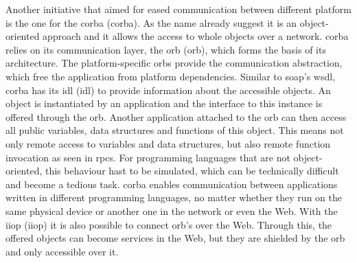 Another initiative that aimed for eased communication between different platform is the one for the \textrm{\acrlong{corba} (\acrshort{corba})}\cite{dec1991common}.
As the name already suggest it is an object-oriented approach and it allows the access to whole objects over a network.
\textrm{\acrshort{corba}} relies on its communication layer, the \textrm{\acrlong{orb} (\acrshort{orb})}, which forms the basis of its architecture.
The platform-specific \textrm{\acrshort{orb}}s provide the communication abstraction, which free the application from platform dependencies.
Similar to \textrm{\acrshort{soap}}'s \textrm{\acrshort{wsdl}}, \textrm{\acrshort{corba}} has its \textrm{\acrlong{idl} (\acrshort{idl})} to provide information about the accessible objects.
An object is instantiated by an application and the interface to this instance is offered through the \textrm{\acrshort{orb}}.
Another application attached to the \textrm{\acrshort{orb}} can then access all public variables, data structures and functions of this object.
This means not only remote access to variables and data structures, but also remote function invocation as seen in \textrm{\acrshort{rpc}}s.
For programming languages that are not object-oriented, this behaviour hast to be simulated, which can be technically difficult and become a tedious task.
\textrm{\acrshort{corba}} enables communication between applications written in different programming languages, no matter whether they run on the same physical device or another one in the network or even the Web.
With the \textrm{\acrlong{iiop} (\acrshort{iiop})} it is also possible to connect \textrm{\acrshort{orb}}'s over the Web.
Through this, the offered objects can become services in the Web, but they are shielded by the \textrm{\acrshort{orb}} and only accessible over it.


